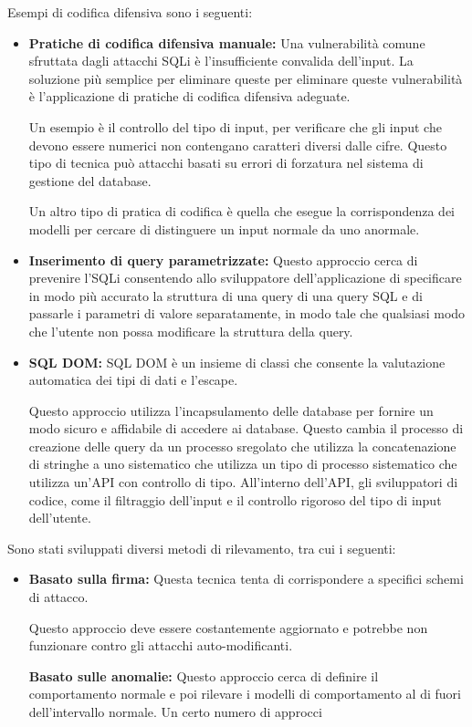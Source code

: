 \singlespacing

Esempi di codifica difensiva sono i seguenti:

\begin{itemize}
    \item \textbf{Pratiche di codifica difensiva manuale:} Una vulnerabilità comune sfruttata dagli attacchi SQLi è l'insufficiente convalida dell'input. La soluzione più semplice per eliminare queste per eliminare queste vulnerabilità è l'applicazione di pratiche di codifica difensiva adeguate. 
    
    Un esempio è il controllo del tipo di input, per verificare che gli input che devono essere numerici non contengano caratteri diversi dalle cifre. Questo tipo di tecnica può attacchi basati su errori di forzatura nel sistema di gestione del database.
    
    \singlespacing
    
    Un altro tipo di pratica di codifica è quella che esegue la corrispondenza dei modelli per cercare di distinguere un input normale da uno anormale.
    
    \item \textbf{Inserimento di query parametrizzate:} Questo approccio cerca di prevenire l'SQLi consentendo allo sviluppatore dell'applicazione di specificare in modo più accurato la struttura di una query di una query SQL e di passarle i parametri di valore separatamente, in modo tale che qualsiasi modo che l'utente non possa modificare la struttura della query.
    
    \item \textbf{SQL DOM:} SQL DOM è un insieme di classi che consente la valutazione automatica dei tipi di dati e l'escape.
    
    Questo approccio utilizza l'incapsulamento delle database per fornire un modo sicuro e affidabile di accedere ai database. Questo cambia il processo di creazione delle query da un processo sregolato che utilizza la concatenazione di stringhe a uno sistematico che utilizza un tipo di processo sistematico che utilizza un'API con controllo di tipo. All'interno dell'API, gli sviluppatori di codice, come il filtraggio dell'input e il controllo rigoroso del tipo di input dell'utente.
\end{itemize}

Sono stati sviluppati diversi metodi di rilevamento, tra cui i seguenti:
\begin{itemize}
    \item \textbf{Basato sulla firma:} Questa tecnica tenta di corrispondere a specifici schemi di attacco.
    
    Questo approccio deve essere costantemente aggiornato e potrebbe non funzionare contro gli attacchi auto-modificanti.
    
    \textbf{Basato sulle anomalie:} Questo approccio cerca di definire il comportamento normale e poi rilevare i modelli di comportamento al di fuori dell'intervallo normale. Un certo numero di approcci
\end{itemize}
